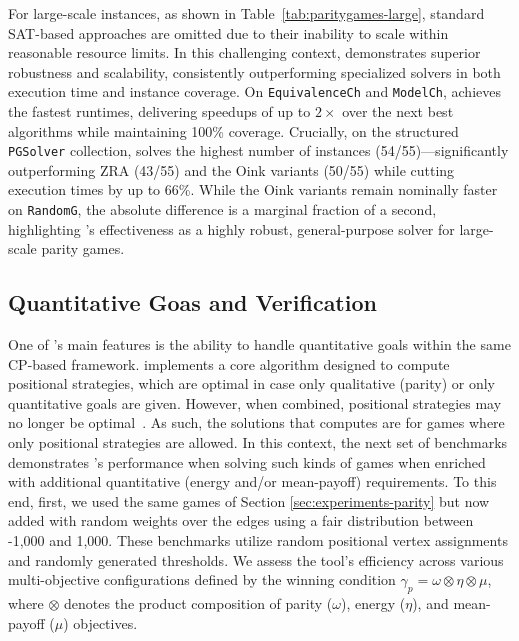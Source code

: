 \documentclass[runningheads]{llncs}
\begin{document}
For large-scale instances, as shown in Table~\ref{tab:paritygames-large}, standard SAT-based approaches are omitted due to their inability to scale within reasonable resource limits. In this challenging context, \nocq demonstrates superior robustness and scalability, consistently outperforming specialized solvers in both execution time and instance coverage. On \texttt{EquivalenceCh} and \texttt{ModelCh}, \nocq achieves the fastest runtimes, delivering speedups of up to $2\times$ over the next best algorithms while maintaining 100\% coverage. Crucially, on the structured \texttt{PGSolver} collection, \nocq solves the highest number of instances (54/55)—significantly outperforming ZRA (43/55) and the Oink variants (50/55) while cutting execution times by up to 66\%. While the Oink variants remain nominally faster on \texttt{RandomG}, the absolute difference is a marginal fraction of a second, highlighting \nocq's effectiveness as a highly robust, general-purpose solver for large-scale parity games.

\subsection{Quantitative Goas and Verification}

One of \nocq's main features is the ability to handle quantitative goals within the same CP-based framework. 
%
\nocq implements a core algorithm designed to compute positional strategies, which are optimal in case only qualitative (parity) or only quantitative goals are given. However, when combined, positional strategies may no longer be optimal~\cite{ChatterjeeHJ05,Chatterjee:2010}. As such, the solutions that \nocq computes are for games where only positional strategies are allowed. 
%
In this context, the next set of benchmarks demonstrates \nocq's performance when solving such kinds of games when enriched with additional quantitative (energy and/or mean-payoff) requirements.  
%
To this end, first, we used the same games of Section \ref{sec:experiments-parity} but now added with random weights over the edges using a fair distribution between -1,000 and 1,000. These benchmarks utilize random positional vertex assignments and randomly generated thresholds. We assess the tool's efficiency across various multi-objective configurations defined by the winning condition $\gamma_{p} = \omega \otimes \eta \otimes \mu$, where $\otimes$ denotes the product composition of parity ($\omega$), energy ($\eta$), and mean-payoff ($\mu$) objectives.
\end{document}
